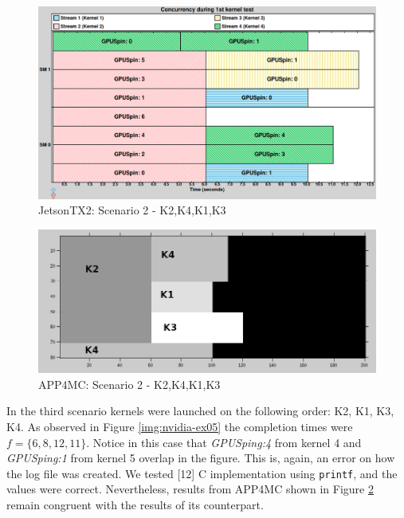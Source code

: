 \documentclass[
  12pt,
  a4paperpaper,
]{report}
\begin{document}
\begin{figure}
\centering
\includegraphics[width=1\textwidth,height=\textheight]{source/figures/nvidia/ex02.png}
\caption{JetsonTX2: Scenario 2 - K2,K4,K1,K3 \label{img:nvidia-ex02}}
\end{figure}

\begin{figure}
\centering
\includegraphics[width=1\textwidth,height=\textheight]{source/figures/octave/ex02.png}
\caption{APP4MC: Scenario 2 - K2,K4,K1,K3 \label{img:octave-ex02}}
\end{figure}

In the third scenario kernels were launched on the following order: K2,
K1, K3, K4. As observed in Figure \ref{img:nvidia-ex05} the completion
times were \(f = \{6,8,12,11\}\). Notice in this case that
\emph{GPUSping:4} from kernel 4 and \emph{GPUSping:1} from kernel 5
overlap in the figure. This is, again, an error on how the log file was
created. We tested {[}12{]} C implementation using \texttt{printf}, and
the values were correct. Nevertheless, results from APP4MC shown in
Figure \ref{img:octave-ex02} remain congruent with the results of its
counterpart.
\end{document}
